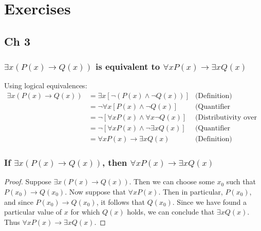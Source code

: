\documentclass{report}
\theoremstyle{definition}
\begin{document}
\newpage

\appendix
\chapter{Exercises}
\section{Ch 3}
\subsection{$\exists x(P(x)\to Q(x))$ is equivalent to $\forall xP(x)\to\exists xQ(x)$}
Using logical equivalences:
\begin{align*}
\exists x(P(x)\to Q(x))&=\exists x[\neg(P(x)\land\neg Q(x))]&\text{(Definition)}\\
&=\neg\forall x[P(x)\land\neg Q(x)]&\text{(Quantifier negation)}\\
&=\neg[\forall xP(x)\land\forall x\neg Q(x)]&\text{(Distributivity over conjuction)}\\
&=\neg[\forall xP(x)\land\neg\exists xQ(x)]&\text{(Quantifier negation)}\\
&=\forall xP(x)\to\exists xQ(x)&\text{(Definition)}
\end{align*}

\subsection{If $\exists x(P(x)\to Q(x))$, then $\forall xP(x)\to\exists xQ(x)$}
\begin{proof}
Suppose $\exists x(P(x)\to Q(x))$. Then we can choose some $x_0$ such that $P(x_0)\to Q(x_0)$. Now suppose that $\forall xP(x)$.
Then in particular, $P(x_0)$, and since $P(x_0)\to Q(x_0)$, it follows that $Q(x_0)$. Since we have found a particular 
value of $x$ for which $Q(x)$ holds, we can conclude that $\exists xQ(x)$. Thus $\forall xP(x)\to\exists xQ(x)$.
\end{proof}
\newpage

\subsection{}
\end{document}
